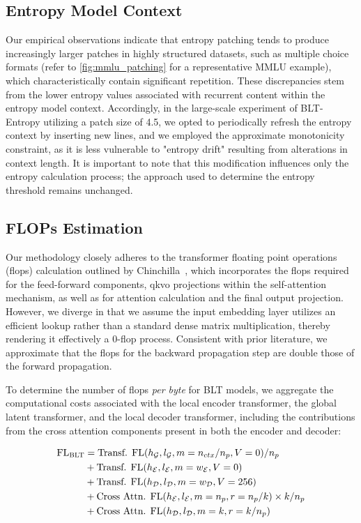 \subsection{Entropy Model Context}
\label{section:entropy-context}
Our empirical observations indicate that entropy patching tends to produce increasingly larger patches in highly structured datasets, such as multiple choice formats (refer to \autoref{fig:mmlu_patching} for a representative MMLU example), which characteristically contain significant repetition. These discrepancies stem from the lower entropy values associated with recurrent content within the entropy model context. Accordingly, in the large-scale experiment of {\textsc BLT}-Entropy utilizing a patch size of 4.5, we opted to periodically refresh the entropy context by inserting new lines, and we employed the approximate monotonicity constraint, as it is less vulnerable to "entropy drift" resulting from alterations in context length. It is important to note that this modification influences only the entropy calculation process; the approach used to determine the entropy threshold remains unchanged.

\subsection{FLOPs Estimation} 
\label{section:flops}

Our methodology closely adheres to the transformer floating point operations (flops) calculation outlined by Chinchilla~\citep{hoffmann2022training}, which incorporates the flops required for the feed-forward components, qkvo projections within the self-attention mechanism, as well as for attention calculation and the final output projection. However, we diverge in that we assume the input embedding layer utilizes an efficient lookup rather than a standard dense matrix multiplication, thereby rendering it effectively a 0-flop process. Consistent with prior literature, we approximate that the flops for the backward propagation step are double those of the forward propagation.

To determine the number of flops \textit{per byte} for {\textsc BLT} models, we aggregate the computational costs associated with the local encoder transformer, the global latent transformer, and the local decoder transformer, including the contributions from the cross attention components present in both the encoder and decoder:

\begin{align}
    \text{FL}_{\text{{\textsc BLT}}} &= \text{Transf. FL}(h_{\mathcal{G}}, l_{\mathcal{G}}, m=n_{ctx}/n_p,V=0) / n_p\\
   &+ \text{Transf. FL}(h_{\mathcal{E}}, l_{\mathcal{E}}, m=w_{\mathcal{E}}, V=0) \\
   &+ \text{Transf. FL}(h_{\mathcal{D}}, l_{\mathcal{D}}, m=w_{\mathcal{D}}, V=256) \\ 
    &+ \text{Cross Attn. FL}(h_{\mathcal{E}}, l_{\mathcal{E}}, m=n_p, r=n_p/k) \times k/n_p \\ 
   &+ \text{Cross Attn. FL}(h_{\mathcal{D}}, l_{\mathcal{D}}, m=k, r=k/n_p)
\end{align}

